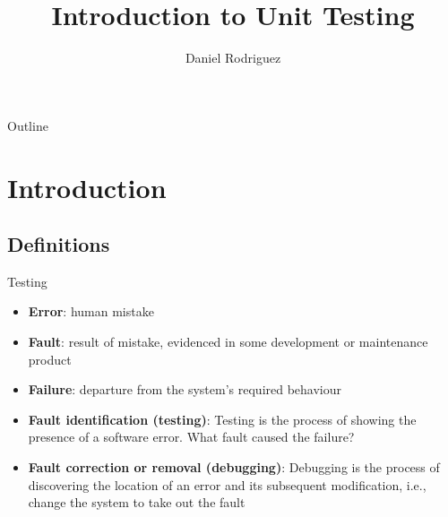 \documentclass[11pt, xcolor=svgnames]{beamer}
\title {Introduction to Unit Testing}
\author[D Rodriguez]{
  \textcolor{green!50!black}{Daniel Rodriguez}%
}
\institute[UAH]{Univ of Alcala}
\date{}
\providecommand{\alert}[1]{\textbf{#1}}
\begin{document}
\maketitle

\begin{frame}[fragile]{Outline}
  \tableofcontents
\end{frame}

\AtBeginSection
{
\begin{frame}
  \tableofcontents[currentsection]
\end{frame}
}


\section{Introduction}


\subsection{Definitions}


\begin{frame}{Testing}

\begin{itemize}
 \item \alert{Error}: human mistake
 \item \alert{Fault}: result of mistake, evidenced in some development or maintenance product
 \item \alert{Failure}:  departure from the system's required behaviour
\end{itemize}

\begin{itemize}
 \item \alert{Fault identification (testing)}: Testing is the process of showing the presence of a software error. What fault caused the failure?
 \item \alert{Fault correction or removal (debugging)}: Debugging is the process of discovering the location of an error and its subsequent modification, i.e., change the system to take out the fault
\end{itemize}


\end{frame}
\end{document}
